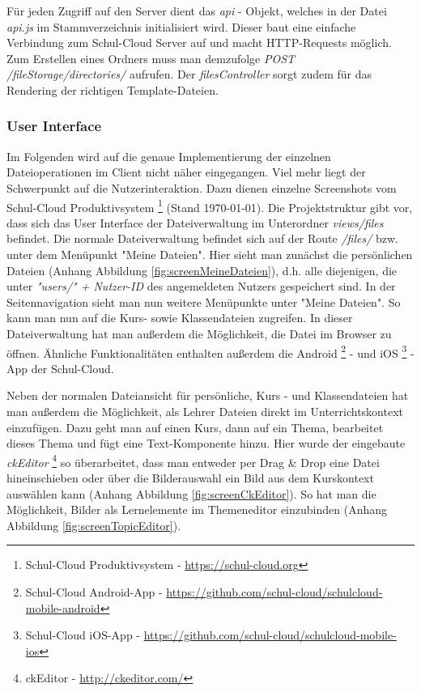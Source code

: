 Für jeden Zugriff auf den Server dient das \textit{api} - Objekt, welches in der Datei \textit{api.js} im Stammverzeichnis initialisiert wird. Dieser baut eine einfache Verbindung zum Schul-Cloud Server auf und macht HTTP-Requests möglich. Zum Erstellen eines Ordners muss man demzufolge \textit{POST /fileStorage/directories/} aufrufen. Der \textit{filesController} sorgt zudem für das Rendering der richtigen Template-Dateien.

\subsubsection{User Interface}
\label{sec:userinterface}
Im Folgenden wird auf die genaue Implementierung der einzelnen Dateioperationen im Client nicht näher eingegangen. Viel mehr liegt der Schwerpunkt auf die Nutzerinteraktion. Dazu dienen einzelne Screenshots vom Schul-Cloud Produktivsystem \footnote{Schul-Cloud Produktivsystem - \url{https://schul-cloud.org}} (Stand \today). Die Projektstruktur gibt vor, dass sich das User Interface der Dateiverwaltung im Unterordner \textit{views/files} befindet. Die normale Dateiverwaltung befindet sich auf der Route \textit{/files/} bzw. unter dem Menüpunkt "Meine Dateien". Hier sieht man zunächst die persönlichen Dateien (Anhang Abbildung \ref{fig:screenMeineDateien}), d.h. alle diejenigen, die unter \textit{"users/" + Nutzer-ID} des angemeldeten Nutzers gespeichert sind. In der Seitennavigation sieht man nun weitere Menüpunkte unter "Meine Dateien". So kann man nun auf die Kurs- sowie Klassendateien zugreifen. In dieser Dateiverwaltung hat man außerdem die Möglichkeit, die Datei im Browser zu öffnen. Ähnliche Funktionalitäten enthalten außerdem die Android \footnote{Schul-Cloud Android-App - \url{https://github.com/schul-cloud/schulcloud-mobile-android}} - und iOS \footnote{Schul-Cloud iOS-App - \url{https://github.com/schul-cloud/schulcloud-mobile-ios}} - App der Schul-Cloud.

Neben der normalen Dateiansicht für persönliche, Kurs - und Klassendateien hat man außerdem die Möglichkeit, als Lehrer Dateien direkt im Unterrichtskontext einzufügen. Dazu geht man auf einen Kurs, dann auf ein Thema, bearbeitet dieses Thema und fügt eine Text-Komponente hinzu. Hier wurde der eingebaute \textit{ckEditor} \footnote{ckEditor - \url{http://ckeditor.com/}} so überarbeitet, dass man entweder per Drag \& Drop eine Datei hineinschieben oder über die Bilderauswahl ein Bild aus dem Kurskontext auswählen kann (Anhang Abbildung \ref{fig:screenCkEditor}). So hat man die Möglichkeit, Bilder als Lernelemente im Themeneditor einzubinden (Anhang Abbildung \ref{fig:screenTopicEditor}).

